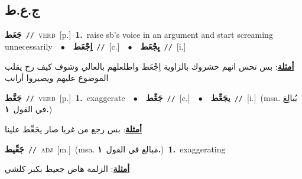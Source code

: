 \documentclass[10pt,a4paper,twoside]{article} %
\begin{document}
\begin{multicols}{2}
\vspace{-3mm}
\subsection*{\color{blue}\foreignlanguage{arabic}{ج.ع.ط}\color{blue}{}} 

{\setlength\topsep{0pt}\textbf{\foreignlanguage{arabic}{جَعَط}}\ {\color{gray}\texttt{//}\color{black}}\ \textsc{verb}\ [p.]\ \textbf{1.}~raise sb's voice in an argument and start screaming unnecessarily\ \ $\bullet$\ \ \setlength\topsep{0pt}\textbf{\foreignlanguage{arabic}{اِجْعَط}}\ {\color{gray}\texttt{//}\color{black}}\ [c.]\ \ $\bullet$\ \ \setlength\topsep{0pt}\textbf{\foreignlanguage{arabic}{يِجْعَط}}\ {\color{gray}\texttt{//}\color{black}}\ [i.]\  \begin{flushright}\color{gray}\foreignlanguage{arabic}{\textbf{\underline{\foreignlanguage{arabic}{أمثلة}}}: بس تحس انهم حشروك بالزاوية اِجْعَط واطلعلهم بالعالي وشوف كيف رح يقلب الموضوع عليهم ويصيروا أرانب}\end{flushright}\color{black}} \vspace{2mm}

{\setlength\topsep{0pt}\textbf{\foreignlanguage{arabic}{جَعَّط}}\ {\color{gray}\texttt{//}\color{black}}\ \textsc{verb}\ [p.]\ \textbf{1.}~exaggerate\ \ $\bullet$\ \ \setlength\topsep{0pt}\textbf{\foreignlanguage{arabic}{جَعِّط}}\ {\color{gray}\texttt{//}\color{black}}\ [c.]\ \ $\bullet$\ \ \setlength\topsep{0pt}\textbf{\foreignlanguage{arabic}{يجَعِّط}}\ {\color{gray}\texttt{//}\color{black}}\ [i.]\ \color{gray}(msa. \foreignlanguage{arabic}{يُبالِغ في القول}~\foreignlanguage{arabic}{\textbf{١.}})\color{black}\  \begin{flushright}\color{gray}\foreignlanguage{arabic}{\textbf{\underline{\foreignlanguage{arabic}{أمثلة}}}: بس رجع من غربا صار يجَعِّط علينا}\end{flushright}\color{black}} \vspace{2mm}

{\setlength\topsep{0pt}\textbf{\foreignlanguage{arabic}{جَعِّيط}}\ {\color{gray}\texttt{//}\color{black}}\ \textsc{adj}\ [m.]\ \color{gray}(msa. \foreignlanguage{arabic}{مبالغ في القول}~\foreignlanguage{arabic}{\textbf{١.}})\color{black}\ \textbf{1.}~exaggerating\  \begin{flushright}\color{gray}\foreignlanguage{arabic}{\textbf{\underline{\foreignlanguage{arabic}{أمثلة}}}: الزلمة هاض جعيط بكبر كلشي}\end{flushright}\color{black}} \vspace{2mm}


\end{multicols}
\end{document}
